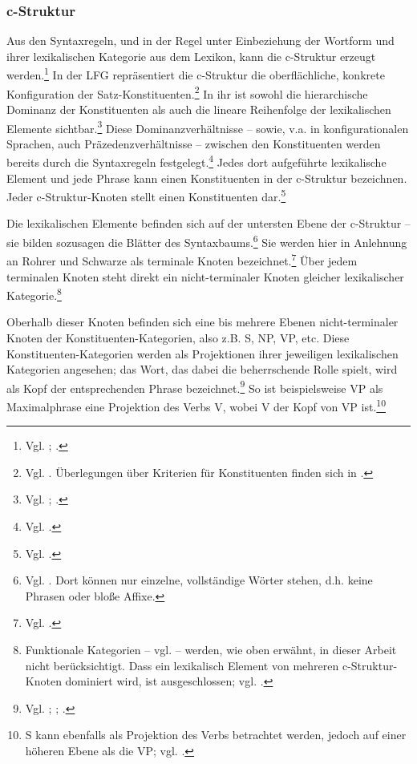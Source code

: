 \documentclass[12pt,a4paper]{article}
\begin{document}
\subsubsection{c-Struktur}
Aus den Syntaxregeln, und in der Regel unter Einbeziehung der Wortform und ihrer lexikalischen Kategorie aus dem Lexikon, kann die c-Struktur erzeugt werden.\footnote{Vgl. \cite[14]{Rohrer}; \cite[6]{Skript}.} In der LFG repräsentiert die c-Struktur die oberflächliche, konkrete Konfiguration der Satz-Konstituenten.\footnote{Vgl. \cite[47]{Dal}. Überlegungen über Kriterien für Konstituenten finden sich in \cite[48-9]{Dal}.} In ihr ist sowohl die hierarchische Dominanz der Konstituenten als auch die lineare Reihenfolge der lexikalischen Elemente sichtbar.\footnote{Vgl. \cite[7]{Dal}; \cite[13]{Rohrer}.} Diese Dominanzverhältnisse -- sowie, v.a. in konfigurationalen Sprachen, auch Präzedenzverhältnisse -- zwischen den Konstituenten werden bereits durch die Syntaxregeln festgelegt.\footnote{Vgl. \cite[19]{Rohrer}.} Jedes dort aufgeführte lexikalische Element und jede Phrase kann einen Konstituenten in der c-Struktur bezeichnen. Jeder c-Struktur-Knoten stellt einen Konstituenten dar.\footnote{Vgl. \cite[5]{Skript}.} 

Die lexikalischen Elemente befinden sich auf der untersten Ebene der c-Struktur -- sie bilden sozusagen die Blätter des Syntaxbaums.\footnote{Vgl. \cite[7]{Dal}. Dort können nur einzelne, vollständige Wörter stehen, d.h. keine Phrasen oder bloße Affixe.} Sie werden hier in Anlehnung an Rohrer und Schwarze als terminale Knoten bezeichnet.\footnote{Vgl. \cite[14; 61]{Rohrer}.} Über jedem terminalen Knoten steht direkt ein nicht-terminaler Knoten gleicher lexikalischer Kategorie.\footnote{Funktionale Kategorien -- vgl. \cite[46; 53; 63-4]{Dal} -- werden, wie oben erwähnt, in dieser Arbeit nicht berücksichtigt. Dass ein lexikalisch Element von mehreren c-Struktur-Knoten dominiert wird, ist ausgeschlossen; vgl. \cite[63]{Skript}.}

Oberhalb dieser Knoten befinden sich eine bis mehrere Ebenen nicht-terminaler Knoten der Konstituenten-Kategorien, also z.B. S, NP, VP, etc. Diese Konstituenten-Kategorien werden als Projektionen ihrer jeweiligen lexikalischen Kategorien angesehen; das Wort, das dabei die beherrschende Rolle spielt, wird als Kopf der entsprechenden Phrase bezeichnet.\footnote{Vgl. \cite[13; 15]{Rohrer}; \cite[64]{Dal}; \cite[5; 28]{Skript}.} So ist beispielsweise VP als Maximalphrase eine Projektion des Verbs V, wobei V der Kopf von VP ist.\footnote{S kann ebenfalls als Projektion des Verbs betrachtet werden, jedoch auf einer höheren Ebene als die VP; vgl. \cite[15]{Rohrer}.} 
\end{document}
